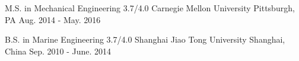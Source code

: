 

\begin{cventries}

  \cventry
    {M.S. in Mechanical Engineering 3.7/4.0} %
    {Carnegie Mellon University } %
    {Pittsburgh, PA} %
    {Aug. 2014 - May. 2016} %
    {
      \begin{cvitems} %
      \end{cvitems}
      \vspace{0.3cm}
    }

  \cventry
    {B.S. in Marine Engineering 3.7/4.0} %
    {Shanghai Jiao Tong University} %
    {Shanghai, China} %
    {Sep. 2010 - June. 2014} %
    {
      \begin{cvitems} %
      \end{cvitems}
    }

\end{cventries}